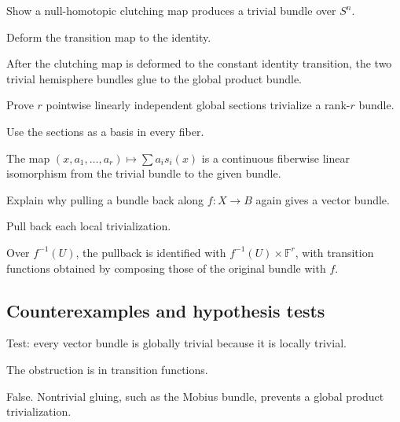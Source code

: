 \begin{exercise}\label{exr:viii30-ped-07}
Show a null-homotopic clutching map produces a trivial bundle over $S^n$.
\end{exercise}
\begin{hint}
Deform the transition map to the identity.
\end{hint}
\begin{solution}
After the clutching map is deformed to the constant identity transition, the two trivial hemisphere bundles glue to the global product bundle.
\end{solution}

\begin{exercise}\label{exr:viii30-ped-08}
Prove $r$ pointwise linearly independent global sections trivialize a rank-$r$ bundle.
\end{exercise}
\begin{hint}
Use the sections as a basis in every fiber.
\end{hint}
\begin{solution}
The map $(x,a_1,\dots,a_r)\mapsto\sum a_is_i(x)$ is a continuous fiberwise linear isomorphism from the trivial bundle to the given bundle.
\end{solution}

\begin{exercise}\label{exr:viii30-ped-09}
Explain why pulling a bundle back along $f:X\to B$ again gives a vector bundle.
\end{exercise}
\begin{hint}
Pull back each local trivialization.
\end{hint}
\begin{solution}
Over $f^{-1}(U)$, the pullback is identified with $f^{-1}(U)\times\mathbb F^r$, with transition functions obtained by composing those of the original bundle with $f$.
\end{solution}

\subsection*{Counterexamples and hypothesis tests}

\begin{exercise}\label{exr:viii30-ped-10}
Test: every vector bundle is globally trivial because it is locally trivial.
\end{exercise}
\begin{hint}
The obstruction is in transition functions.
\end{hint}
\begin{solution}
False. Nontrivial gluing, such as the Mobius bundle, prevents a global product trivialization.
\end{solution}

